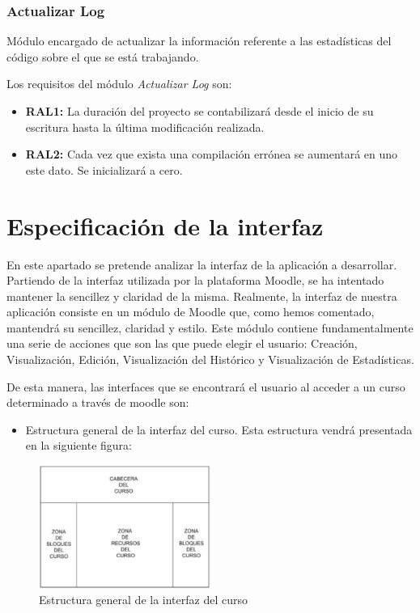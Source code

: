 \subsubsection{Actualizar Log}

Módulo encargado de actualizar la información referente a las estadísticas del código sobre el que se está trabajando.

Los requisitos del módulo \emph{Actualizar Log} son:

\begin{itemize}
	\item \textbf{RAL1:} La duración del proyecto se contabilizará desde el inicio de su escritura hasta la última modificación realizada.
	\item \textbf{RAL2:} Cada vez que exista una compilación errónea se aumentará en uno este dato. Se inicializará a cero.
\end{itemize}

\section{Especificación de la interfaz}

En este apartado se pretende analizar la interfaz de la aplicación a desarrollar. Partiendo de la interfaz utilizada por la plataforma Moodle, se ha intentado mantener la sencillez y claridad de la misma. Realmente, la interfaz de nuestra aplicación consiste en un módulo de Moodle que, como hemos comentado, mantendrá su sencillez, claridad y estilo. Este módulo contiene fundamentalmente una serie de acciones que son las que puede elegir el usuario: Creación, Visualización, Edición, Visualización del Histórico y Visualización de Estadísticas.

De esta manera, las interfaces que se encontrará el usuario al acceder a un curso determinado a través de moodle son:

\begin{itemize}
	\item Estructura general de la interfaz del curso. Esta estructura vendrá presentada en la siguiente figura:
\end{itemize}

\begin{figure}[h]
	\centering
	\includegraphics[width=0.5\textwidth]{./img/c3-estructuracursomoodle.eps}
	\caption{Estructura general de la interfaz del curso}
\end{figure}

